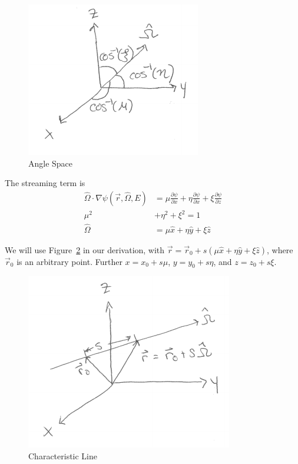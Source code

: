 \documentclass[12pt]{article}
\newcommand{\rvec}{\ensuremath{\vec{r}}}
\newcommand{\vOmega}{\ensuremath{\hat{\Omega}}}
\begin{document}
\begin{figure}[h!] 
    \label{fig:cosines}
    \begin{center}
    \includegraphics[keepaspectratio, width = 2 in]{../figs/cosines}
    \end{center}    
    \caption{Angle Space}
    \label{fig:angles}
\end{figure}
%
The streaming term is 
\begin{align*}
\vOmega \cdot \nabla \psi(\rvec, \vOmega, E) &= \mu \frac{\partial \psi}{\partial x} + \eta \frac{\partial \psi}{\partial x} + \xi \frac{\partial \psi}{\partial z} \\
\mu^2 &+ \eta^2 + \xi^2 = 1 \\
\vOmega &= \mu \hat{x} + \eta \hat{y} + \xi \hat{z}
\end{align*}
%

We will use Figure~\ref{fig:stream} in our derivation, with $\vec{r} = \rvec_0 + s(\mu \hat{x} + \eta \hat{y} + \xi \hat{z})$, where $\rvec_0$ is an arbitrary point.
Further $x = x_0 + s\mu$, $y = y_0 + s\eta$, and $z = z_0 + s\xi$.
%
\begin{figure}[h!] 
    \begin{center}
    \includegraphics[keepaspectratio, width = 2.5 in]{../figs/moc-stream}    
    \end{center}   
    \caption{Characteristic Line}
    \label{fig:stream}
\end{figure}
\end{document}

